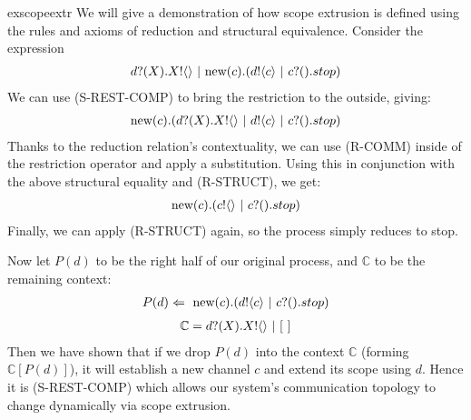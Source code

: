 \begin{example}{exscopeextr}
	We will give a demonstration of how scope extrusion is defined using the rules and axioms of reduction and structural equivalence.  Consider the expression 
\begin{align}
	{d}?({X}).{X}!\langle{}\rangle\ |\  \text{new}({c}).({d}!\langle{c}\rangle \ |\  {c}?({}).stop)	
\end{align}
We can use (S-REST-COMP) to bring the restriction to the outside, giving:
\begin{align}
	\text{new}({c}).({d}?({X}).{X}!\langle{}\rangle\ |\  {d}!\langle{c}\rangle \ |\  {c}?({}).stop)		
\end{align}
	Thanks to the reduction relation's contextuality, we can use (R-COMM) inside of the restriction operator and apply a substitution.  Using this in conjunction with the above structural equality and (R-STRUCT), we get:
	\begin{align}
		\text{new}({c}).({c}!\langle{}\rangle \ |\  {c}?({}).stop)
	\end{align}
	Finally, we can apply (R-STRUCT) again, so the process simply reduces to stop.  

	Now let $P(d)$ to be the right half of our original process, and $\mathbb{C}$ to be the remaining context:
	\begin{align}
		P(d) \Leftarrow\  \text{new}({c}).({d}!\langle{c}\rangle \ |\  {c}?({}).stop)
	\end{align}
	\begin{align}
		\mathbb{C} = {d}?({X}).{X}!\langle{}\rangle \ |\  [\ ]
	\end{align}
Then we have shown that if we drop $P(d)$ into the context $\mathbb{C}$ (forming $\mathbb{C}[P(d)]$), it will establish a new channel $c$ and extend its scope using $d$.  Hence it is (S-REST-COMP) which allows our system's communication topology to change dynamically via scope extrusion.
\end{example}
